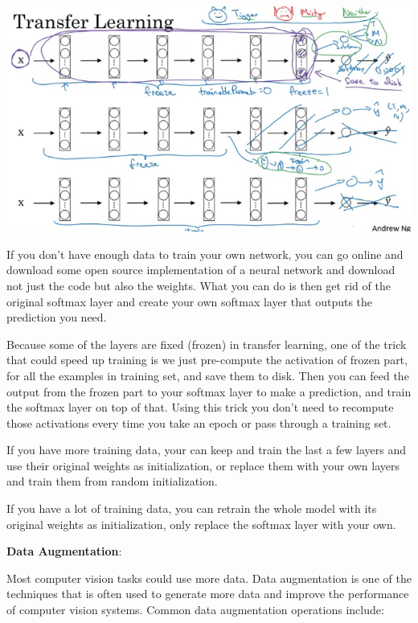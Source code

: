 \documentclass{article}
\begin{document}
\begin{center}
\includegraphics[scale=0.5]{./images/transfer_learning.png}
\end{center}

\noindent If you don't have enough data to train your own network, you can go online and download some open source implementation of a neural network and download not just the code but also the weights. What you can do is then get rid of the original softmax layer and create your own softmax layer that outputs the prediction you need.

\bigskip

\noindent Because some of the layers are fixed (frozen) in transfer learning, one of the trick that could speed up training is we just pre-compute the activation of frozen part, for all the examples in training set, and save them to disk. Then you can feed the output from the frozen part to your softmax layer to make a prediction, and train the softmax layer on top of that. Using this trick you don't need to recompute those activations every time you take an epoch or pass through a training set.

\bigskip

\noindent If you have more training data, your can keep and train the last a few layers and use their original weights as initialization, or replace them with your own layers and train them from random initialization.

\bigskip

\noindent If you have a lot of training data, you can retrain the whole model with its original weights as initialization, only replace the softmax layer with your own.

\bigskip

\noindent \textbf{Data Augmentation}:

\noindent Most computer vision tasks could use more data. Data augmentation is one of the techniques that is often used to generate more data and improve the performance of computer vision systems. Common data augmentation operations include:
\end{document}
